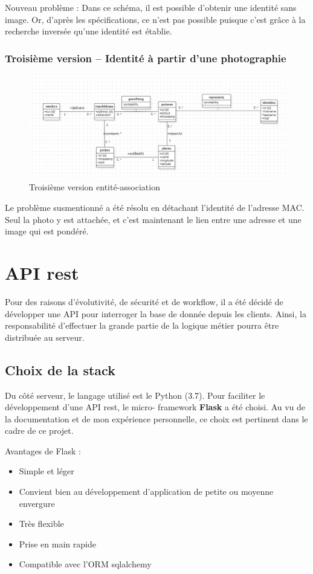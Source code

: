 Nouveau problème : Dans ce schéma, il est possible d’obtenir une identité sans image. Or, d’après les
spécifications, ce n’est pas possible puisque c’est grâce à la recherche inversée qu’une identité est établie.

\subsubsection{Troisième version – Identité à partir d’une photographie}

\begin{figure}[H]
	\centering
	\includegraphics[width=12cm]{images/proto-3.png}
	\caption{Troisième version entité-association}
	\label{fig:arealytics}
\end{figure}

Le problème susmentionné a été résolu en détachant l’identité de l’adresse MAC. Seul la photo y est attachée, et
c’est maintenant le lien entre une adresse et une image qui est pondéré.

\section{API rest}

Pour des raisons d’évolutivité, de sécurité et de workflow, il a été décidé de développer une API pour interroger la
base de donnée depuis les clients. Ainsi, la responsabilité d’effectuer la grande partie de la logique métier pourra
être distribuée au serveur.

\subsection{Choix de la stack}

Du côté serveur, le langage utilisé est le Python (3.7). Pour faciliter le développement d’une API rest, le micro-
framework \textbf{Flask} a été choisi. Au vu de la documentation et de mon expérience personnelle, ce choix est pertinent
dans le cadre de ce projet.

Avantages de Flask :
\begin{itemize}
\item Simple et léger
\item Convient bien au développement d’application de petite ou moyenne envergure
\item Très flexible
\item Prise en main rapide
\item Compatible avec l’ORM sqlalchemy
\end{itemize}

